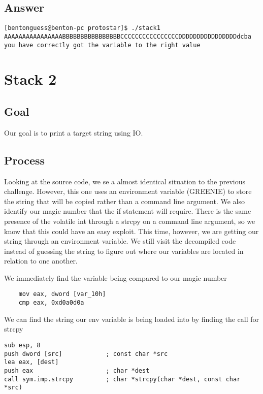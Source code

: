 \documentclass[11pt]{article}
\begin{document}
\subsection*{Answer}

\begin{lstlisting}
[bentonguess@benton-pc protostar]$ ./stack1 AAAAAAAAAAAAAAAABBBBBBBBBBBBBBBBCCCCCCCCCCCCCCCCDDDDDDDDDDDDDDDDdcba
you have correctly got the variable to the right value
\end{lstlisting}

\section*{Stack 2}

\subsection*{Goal}
Our goal is to print a target string using IO.

\subsection*{Process}
Looking at the source code, we se a almost identical situation to the previous challenge. However, this one uses an environment variable (GREENIE) to store the string that will be copied rather than a command line argument. We also identify our magic number that the if statement will require. There is the same presence of the volatile int through a strcpy on a command line argument, so we know that this could have an easy exploit. This time, however, we are getting our string through an environment variable. We still visit the decompiled code instead of guessing the string to figure out where our variables are located in relation to one another.

We immediately find the variable being compared to our magic number 
\begin{lstlisting}
    mov eax, dword [var_10h]
    cmp eax, 0xd0a0d0a
\end{lstlisting}

We can find the string our env variable is being loaded into by finding the call for strcpy
\begin{lstlisting}
sub esp, 8
push dword [src]            ; const char *src
lea eax, [dest]
push eax                    ; char *dest
call sym.imp.strcpy         ; char *strcpy(char *dest, const char *src)
\end{lstlisting}
\end{document}
